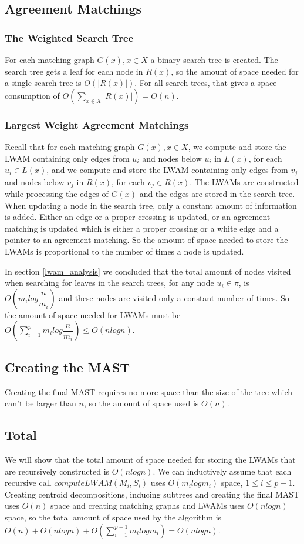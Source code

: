 \subsection{Agreement Matchings}
\subsubsection{The Weighted Search Tree}
For each matching graph $G(x), x \in X$ a binary search tree is created. The search tree gets a leaf for each node in $R(x)$, so the amount of space needed for a single search tree is $O(|R(x)|)$. For all search trees, that gives a space consumption of $O(\sum_{x \in X} |R(x)|) = O(n)$.

\subsubsection{Largest Weight Agreement Matchings}
Recall that for each matching graph $G(x), x \in X$, we compute and store the LWAM containing only edges from $u_i$ and nodes below $u_i$ in $L(x)$, for each $u_i \in L(x)$, and we compute and store the LWAM containing only edges from $v_j$ and nodes below $v_j$ in $R(x)$, for each $v_j \in R(x)$. The LWAMs are constructed while processing the edges of $G(x)$ and the edges are stored in the search tree. When updating a node in the search tree, only a constant amount of information is added. Either an edge or a proper crossing is updated, or an agreement matching is updated which is either a proper crossing or a white edge and a pointer to an agreement matching. So the amount of space needed to store the LWAMs is proportional to the number of times a node is updated.

In section \ref{lwam_analysis} we concluded that the total amount of nodes visited when searching for leaves in the search trees, for any node $u_i \in \pi$, is $O(m_ilog\dfrac{n}{m_i})$ and these nodes are visited only a constant number of times. So the amount of space needed for LWAMs must be  $O(\sum_{i=1}^p m_ilog\dfrac{n}{m_i}) \le O(nlogn)$.

\subsection{Creating the MAST}
Creating the final MAST requires no more space than the size of the tree which can't be larger than $n$, so the amount of space used is $O(n)$.

\subsection{Total}
We will show that the total amount of space needed for storing the LWAMs that are recursively constructed is $O(nlogn)$. We can inductively assume that each recursive call $computeLWAM(M_i, S_i)$ uses $O(m_ilogm_i)$ space, $1 \le i \le p-1$. Creating centroid decompositions, inducing subtrees and creating the final MAST uses $O(n)$ space and creating matching graphs and LWAMs uses $O(nlogn)$ space, so the total amount of space used by the algorithm is $O(n) + O(nlogn) + O(\sum_{i=1}^{p-1} m_ilogm_i) = O(nlogn)$.

